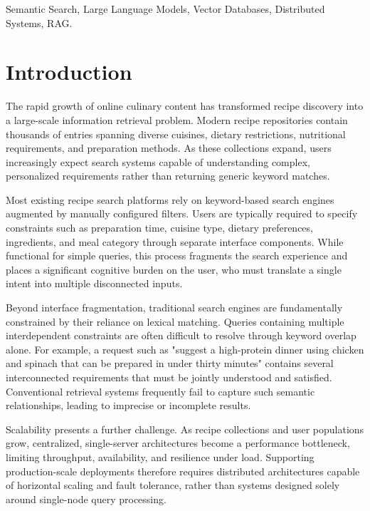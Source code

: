 \documentclass[conference]{IEEEtran}
\begin{document}
\begin{IEEEkeywords}
Semantic Search, Large Language Models, Vector Databases, Distributed Systems, RAG.
\end{IEEEkeywords}


\section{Introduction}
\label{sec:introduction}
The rapid growth of online culinary content has transformed recipe discovery into a large-scale information retrieval problem. Modern recipe repositories contain thousands of entries spanning diverse cuisines, dietary restrictions, nutritional requirements, and preparation methods. As these collections expand, users increasingly expect search systems capable of understanding complex, personalized requirements rather than returning generic keyword matches.

Most existing recipe search platforms rely on keyword-based search engines augmented by manually configured filters\cite{2026CulinaryAIMI}. Users are typically required to specify constraints such as preparation time, cuisine type, dietary preferences, ingredients, and meal category through separate interface components. While functional for simple queries, this process fragments the search experience and places a significant cognitive burden on the user, who must translate a single intent into multiple disconnected inputs.

Beyond interface fragmentation, traditional search engines are fundamentally constrained by their reliance on lexical matching\cite{Fang2020BeyondLA}. Queries containing multiple interdependent constraints are often difficult to resolve through keyword overlap alone. For example, a request such as "suggest a high-protein dinner using chicken and spinach that can be prepared in under thirty minutes" contains several interconnected requirements that must be jointly understood and satisfied. Conventional retrieval systems frequently fail to capture such semantic relationships, leading to imprecise or incomplete results.

Scalability presents a further challenge. As recipe collections and user populations grow, centralized, single-server architectures become a performance bottleneck, limiting throughput, availability, and resilience under load. Supporting production-scale deployments therefore requires distributed architectures capable of horizontal scaling and fault tolerance, rather than systems designed solely around single-node query processing.
\end{document}
